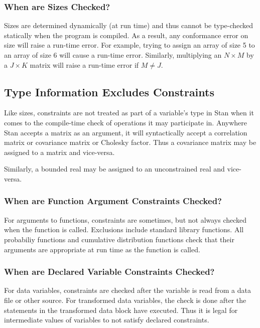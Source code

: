 \subsubsection{When are Sizes Checked?}

Sizes are determined dynamically (at run time) and thus cannot be
type-checked statically when the program is compiled.  As a result,
any conformance error on size will raise a run-time error.  For
example, trying to assign an array of size 5 to an array of size 6
will cause a run-time error.  Similarly, multiplying an $N
\times M$ by a $J \times K$ matrix will raise a run-time error if $M
\neq J$.

\subsection{Type Information Excludes Constraints}

Like sizes, constraints are not treated as part of a variable's type
in Stan when it comes to the compile-time check of operations it may
participate in.  Anywhere Stan accepts a matrix as an argument, it
will syntactically accept a correlation matrix or covariance matrix or
Cholesky factor.  Thus a covariance matrix may be assigned to a matrix
and vice-versa.

Similarly, a bounded real may be assigned to an unconstrained real and
vice-versa.  

\subsubsection{When are Function Argument Constraints Checked?}

For arguments to functions, constraints are sometimes, but not always
checked when the function is called.  Exclusions include \Cpp standard
library functions.  All probabiliy functions and cumulative
distribution functions check that their arguments are appropriate at
run time as the function is called.  

\subsubsection{When are Declared Variable Constraints Checked?}

For data variables, constraints are checked after the variable is read
from a data file or other source.  For transformed data variables, the
check is done after the statements in the transformed data block have
executed.  Thus it is legal for intermediate values of variables to
not satisfy declared constraints.

